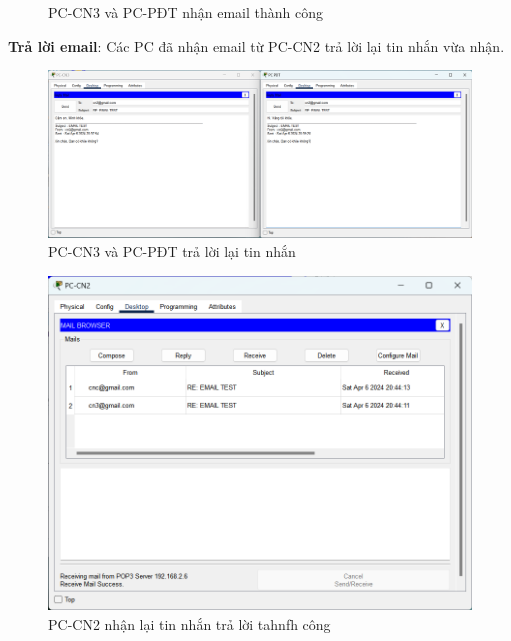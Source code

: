 \documentclass[12pt, a4paper]{article}
\begin{document}
\begin{flushleft}
\begin{figure}[H]
			\caption{PC-CN3 và PC-PĐT nhận email thành công}
		\end{figure}
		\newpage \textbf{Trả lời email}: Các PC đã nhận email từ PC-CN2 trả lời lại tin nhắn vừa nhận.
		\begin{figure}[H]
			\centering
			\includegraphics[width=1\textwidth]{reply_mail.png}
			\caption{PC-CN3 và PC-PĐT trả lời lại tin nhắn}
		\end{figure}
		\begin{figure}[H]
			\centering
			\includegraphics[width=1\textwidth]{sendandreply_steps.png}
			\caption{PC-CN2 nhận lại tin nhắn trả lời tahnfh công}
		\end{figure}
	\end{flushleft}
	
\end{document}
